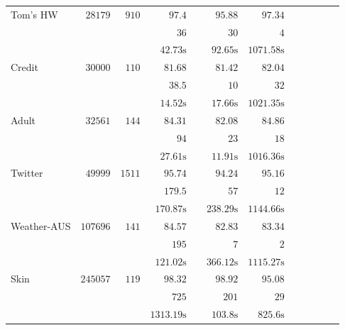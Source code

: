 \begin{table}
\begin{center}
\begin{tabular}{l  r  r r r r r r r rrr}
			{ Tom's HW}   & $  28179 $  & $  910 $  & $   97.4  $    &   \multicolumn{1}{c}{\multirow{3}{*}{\textemdash}}       & $   95.88  $    & $   97.34  $   \\[0.05cm] & & 
			& $   36 $    &       & $   30 $    & $   4 $   \\[0.05cm] & & 
			& $   42.73 \text{s}  $    &       & $   92.65 \text{s}  $    & $   1071.58 \text{s}  $   \\[.3cm] 
			{ Credit}   & $  30000 $  & $  110 $  & $   81.68  $    &   \multicolumn{1}{c}{\multirow{3}{*}{\textemdash}}       & $   81.42  $    & $   82.04  $   \\[0.05cm] & & 
			& $   38.5  $    &       & $   10 $    & $   32 $   \\[0.05cm] & & 
			& $   14.52 \text{s}  $    &       & $   17.66 \text{s}  $    & $   1021.35 \text{s}  $   \\[.3cm] 
			{ Adult}   & $  32561 $  & $  144 $  & $   84.31  $    &   \multicolumn{1}{c}{\multirow{3}{*}{\textemdash}}       & $   82.08  $    & $   84.86  $   \\[0.05cm] & & 
			& $   94 $    &       & $   23 $    & $   18 $   \\[0.05cm] & & 
			& $   27.61 \text{s}  $    &       & $   11.91 \text{s}  $    & $   1016.36 \text{s}  $   \\[.3cm] 
			{ Twitter}   & $  49999 $  & $  1511 $  & $   95.74  $    &   \multicolumn{1}{c}{\multirow{3}{*}{\textemdash}}       & $   94.24  $    & $   95.16  $   \\[0.05cm] & & 
			& $   179.5  $    &       & $   57 $    & $   12 $   \\[0.05cm] & & 
			& $   170.87 \text{s}  $    &       & $   238.29 \text{s}  $    & $   1144.66 \text{s}  $   \\[.3cm] 
			{ Weather-AUS}   & $  107696 $  & $  141 $  & $   84.57  $    &   \multicolumn{1}{c}{\multirow{3}{*}{\textemdash}}       & $   82.83  $    & $   83.34  $   \\[0.05cm] & & 
			& $   195 $    &       & $   7 $    & $   2 $   \\[0.05cm] & & 
			& $   121.02 \text{s}  $    &       & $   366.12 \text{s}  $    & $   1115.27 \text{s}  $   \\[.3cm] 
			{ Skin}   & $  245057 $  & $  119 $  & $   98.32  $    &   \multicolumn{1}{c}{\multirow{3}{*}{\textemdash}}       & $   98.92  $    & $   95.08  $   \\[0.05cm] & & 
			& $   725 $    &       & $   201 $    & $   29 $   \\[0.05cm] & & 
			& $   1313.19 \text{s}  $    &       & $   103.8 \text{s}  $    & $   825.6 \text{s}  $   \\[.3cm] 
			\bottomrule
		\end{tabular}
	\end{center}
	
\end{table}



